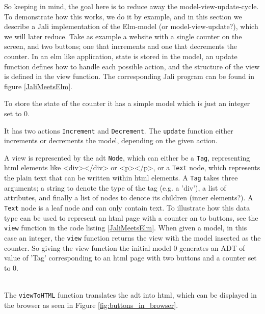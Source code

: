 
So keeping in mind, the goal here is to reduce away the model-view-update-cycle. To demonstrate how this works, we do it by example, and in this section we describe a Jali implementation of the Elm-model (or model-view-update?), which we will later reduce. Take as example a website with a single counter on the screen, and two buttons; one that increments and one that decrements the counter. In an elm like application, state is stored in the model, an update function defines how to handle each possible action, and the structure of the view is defined in the view function. The corresponding Jali program can be found in figure \ref{JaliMeetsElm}. 



To store the state of the counter it has a simple model which is just an integer set to 0. 

It has two actions \texttt{Increment} and \texttt{Decrement}. The \texttt{update} function either increments or decrements the model, depending on the given action. 

A view is represented by the \gls{adt} \texttt{Node}, which can either be a \texttt{Tag}, representing \gls{html} elements like <div></div> or <p></p>, or a \texttt{Text} node, which represents the plain text that can be written within \gls{html} elements. A \texttt{Tag} takes three arguments; a string to denote the type of the tag (e.g. a 'div'), a list of attributes, and finally a list of nodes to denote its children (inner elements?). A \texttt{Text} node is a leaf node and can only contain text. To illustrate how this data type can be used to represent an \gls{html} page with a counter an to buttons, see the \texttt{view} function in the code listing \ref{JaliMeetsElm}. When given a model, in this case an integer, the  \texttt{view} function returns the view with the model inserted as the counter. So giving the view function the initial model 0 generates an ADT of value of 'Tag' corresponding to an \gls{html} page with two buttons and a counter set to 0.
















% 
\\
The \texttt{viewToHTML} function translates the \gls{adt} into \gls{html}, which can be displayed in the browser as seen in Figure \ref{fig:buttons_in_browser}. 

